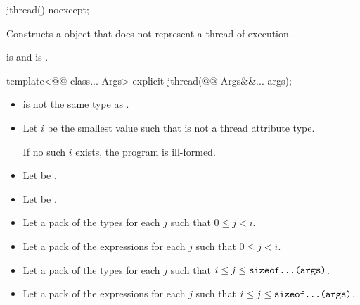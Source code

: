 \documentclass{wg21}
\begin{document}
%
\begin{itemdecl}
jthread() noexcept;
\end{itemdecl}

\begin{itemdescr}
\pnum
\effects
Constructs a  object that does not represent
a thread of execution.

\pnum
\ensures
{} is 
and  is .
\end{itemdescr}

%
\begin{itemdecl}
template<@@ class... Args>
explicit jthread(@@ Args&&... args);\end{itemdecl}\begin{itemdescr}\begin{itemize}
\item {} is not the same type as .
\end{itemize}

\begin{addedblock}
\begin{itemize}[leftmargin=*]
\item Let $i$ be the smallest value such that  is not a thread attribute type.

If no such $i$ exists, the program is ill-formed.

\item Let  be .
\item Let  be .
\item Let  a pack of the types  for each $j$ such that $ 0 \leq j < i $.
\item Let  a pack of the expressions  for each $j$ such that $ 0 \leq j < i $.
\item Let  a pack of the types  for each $j$ such that $ i \le j \le \texttt{sizeof...(args)}$.
\item Let  a pack of the expressions  for each $j$ such that $ i \le j \le \texttt{sizeof...(args)}$.
\end{itemize}
\end{addedblock}


\end{itemdescr}
\end{document}
